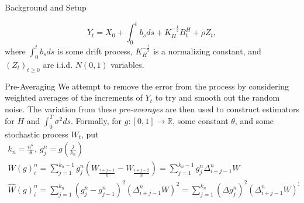 \documentclass[final,hyperref={pdfpagelabels=false}]{beamer}
\newcommand{\R}{\mathbb{R}}
\begin{document}
\begin{frame}{}
\begin{columns}[t]
\begin{column}{0.28\linewidth}
\begin{block}{Background and Setup}
\begin{itemize}
              \[
                Y_t = X_0 + \int_0^t b_sds + K^{-\frac{1}{2}}_HB^H_t + \rho Z_t,
              \]
              where \(\int_0^t b_sds\) is some drift process, \(K^{-\frac{1}{2}}_H\) is a normalizing constant, and \((Z_t)_{t \geq 0}\) are i.i.d. \(N(0,1)\) variables.
          \end{itemize}
        \end{block}
        \begin{block}{Pre-Averaging}
          We attempt to remove the error from the process by considering weighted averages of the increments of \(Y_t\) to try and smooth out the random noise. The variation from these \textit{pre-averages} are then used to construct estimators for \(H\) and \(\int_0^T \sigma^2 ds\). Formally, for \(g: [0,1] \rightarrow \R\), some constant \(\theta\), and some stochastic process \(W_t\), put
          \begin{gather*}
            k_n = \frac{n^\kappa}{\theta}, \ g^n_j = g\left( \frac{j}{k_n} \right) \\
            \overline{W}(g)^n_i = \sum_{j=1}^{k_n-1}g^n_j\left( W_{\frac{i+j-1}{n}} - W_{\frac{i+j-2}{n}} \right) = \sum_{j=1}^{k_n-1}g^n_j\Delta_{i+j-1}^n W \\
            \widehat{W}(g)^n_i = \sum_{j=1}^{k_n}\left(g^n_j - g^n_{j-1}\right)^2\left(\Delta_{i+j-1}^n W\right)^2 = \sum_{j=1}^{k_n}\left(\Delta g^n_j\right)^2\left(\Delta_{i+j-1}^n W\right)^2.
          \end{gather*}
        \end{block}
      \end{column}


\end{columns}
\end{frame}
\end{document}
